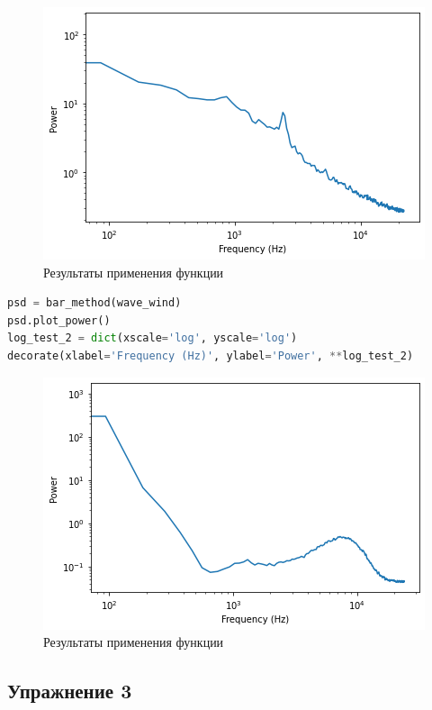 \begin{figure}[H]
	\begin{center}
		\includegraphics[scale=1]{fig/lab04/lab04_05.png}
		\caption{Результаты применения функции}
	\end{center}
\end{figure}

\begin{lstlisting}[language=Python]
psd = bar_method(wave_wind)
psd.plot_power()
log_test_2 = dict(xscale='log', yscale='log')
decorate(xlabel='Frequency (Hz)', ylabel='Power', **log_test_2)
\end{lstlisting}

\begin{figure}[H]
	\begin{center}
		\includegraphics[scale=1]{fig/lab04/lab04_06.png}
		\caption{Результаты применения функции}
	\end{center}
\end{figure}


\subsection{Упражнение 3}

